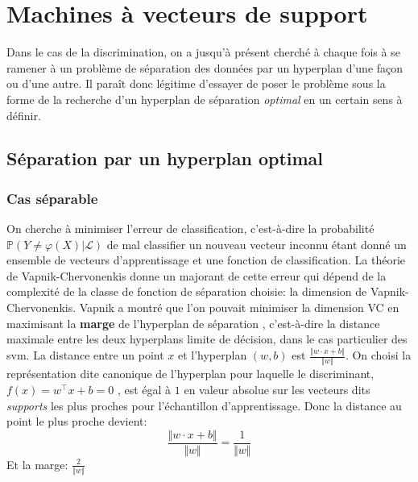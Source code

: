 

\section{Machines à vecteurs de support}

Dans le cas de la discrimination, on a jusqu'à présent cherché à chaque fois à se ramener à un problème de séparation des données par un hyperplan d'une façon ou d'une autre. Il paraît donc légitime d'essayer de poser le problème sous la forme de la recherche d'un hyperplan de séparation \emph{optimal} en un certain sens à définir.

\subsection{Séparation par un hyperplan optimal}
\subsubsection{Cas séparable}

On cherche à minimiser l'erreur de classification, c'est-à-dire la probabilité $\mathbb{P}(Y \neq \varphi (X) | \mathcal{L} )$ de mal classifier un nouveau vecteur inconnu étant donné un ensemble de vecteurs d'apprentissage et une fonction de classification. 
La théorie de Vapnik-Chervonenkis donne un majorant de cette erreur qui dépend de la complexité de la classe de fonction de séparation choisie: la dimension de Vapnik-Chervonenkis. Vapnik a montré que l'on pouvait minimiser la dimension VC en maximisant la \textbf{marge} de l'hyperplan de séparation \citep{Cortes1995}, c'est-à-dire la distance maximale entre les deux hyperplans limite de décision, dans le cas particulier des \ac{svm}.
La distance entre un point $x$ et l'hyperplan $(w,b)$ est $ \frac{\Vert w \cdot x + b \Vert}{\Vert w \Vert} $.
On choisi la représentation dite canonique de l'hyperplan pour laquelle le discriminant, $f(x) = w^\intercal x + b = 0$ , est égal à $1$ en valeur absolue sur les vecteurs dits \textit{supports} les plus proches pour l'échantillon d'apprentissage. Donc la distance au point le plus proche devient:
\begin{equation*}
    \frac{\Vert w \cdot x + b \Vert}{\Vert w \Vert} = \frac{1}{\Vert w \Vert}
\end{equation*}
Et la marge: $\frac{2}{\Vert w \Vert}$

